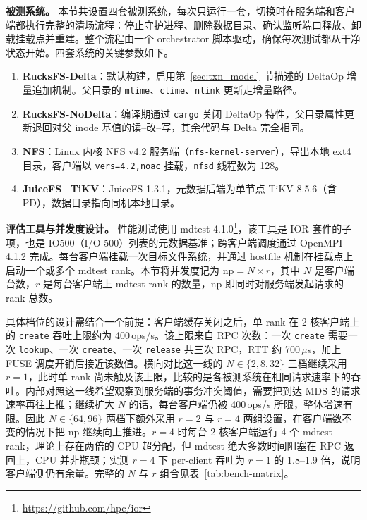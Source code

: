 \textbf{被测系统。} 本节共设置四套被测系统，每次只运行一套，切换时在服务端和客户端都执行完整的清场流程：停止守护进程、删除数据目录、确认监听端口释放、卸载挂载点并重建。整个流程由一个 orchestrator 脚本驱动，确保每次测试都从干净状态开始。四套系统的关键参数如下。

\begin{enumerate}
    \item \textbf{RucksFS-Delta}：默认构建，启用第~\ref{sec:txn_model}~节描述的 DeltaOp 增量追加机制。父目录的 \texttt{mtime}、\texttt{ctime}、\texttt{nlink} 更新走增量路径。
    \item \textbf{RucksFS-NoDelta}：编译期通过 \texttt{cargo} 关闭 DeltaOp 特性，父目录属性更新退回对父 inode 基值的读--改--写，其余代码与 Delta 完全相同。
    \item \textbf{NFS}：Linux 内核 NFS v4.2 服务端（\texttt{nfs-kernel-server}），导出本地 ext4 目录，客户端以 \texttt{vers=4.2,noac} 挂载，\texttt{nfsd} 线程数为 128。
    \item \textbf{JuiceFS+TiKV}：JuiceFS 1.3.1，元数据后端为单节点 TiKV 8.5.6（含 PD），数据目录指向同机本地目录。
\end{enumerate}

\textbf{评估工具与并发度设计。} 性能测试使用 mdtest 4.1.0\footnote{\url{https://github.com/hpc/ior}}，该工具是 IOR 套件的子项，也是 IO500（I/O 500）列表的元数据基准；跨客户端调度通过 OpenMPI 4.1.2 完成。每台客户端挂载一次目标文件系统，并通过 hostfile 机制在挂载点上启动一个或多个 mdtest rank。本节将并发度记为 $\mathrm{np} = N \times r$，其中 $N$ 是客户端台数，$r$ 是每台客户端上 mdtest rank 的数量，$\mathrm{np}$ 即同时对服务端发起请求的 rank 总数。

具体档位的设计需结合一个前提：客户端缓存关闭之后，单 rank 在 2 核客户端上的 \texttt{create} 吞吐上限约为 400\,ops/s。该上限来自 RPC 次数：一次 \texttt{create} 需要一次 \texttt{lookup}、一次 \texttt{create}、一次 \texttt{release} 共三次 RPC，RTT 约 700\,$\mu$s，加上 FUSE 调度开销后接近该数值。横向对比这一线的 $N \in \{2, 8, 32\}$ 三档继续采用 $r=1$，此时单 rank 尚未触及该上限，比较的是各被测系统在相同请求速率下的吞吐。内部对照这一线希望观察到服务端的事务冲突阈值，需要把到达 MDS 的请求速率再往上推；继续扩大 $N$ 的话，每台客户端仍被 400\,ops/s 所限，整体增速有限。因此 $N \in \{64, 96\}$ 两档下额外采用 $r=2$ 与 $r=4$ 两组设置，在客户端数不变的情况下把 $\mathrm{np}$ 继续向上推进。$r=4$ 时每台 2 核客户端运行 4 个 mdtest rank，理论上存在两倍的 CPU 超分配，但 mdtest 绝大多数时间阻塞在 RPC 返回上，CPU 并非瓶颈；实测 $r=4$ 下 per-client 吞吐为 $r=1$ 的 1.8--1.9 倍，说明客户端侧仍有余量。完整的 $N$ 与 $r$ 组合见表~\ref{tab:bench-matrix}。

